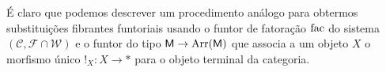 \begin{obs}
  É claro que podemos descrever um procedimento análogo para obtermos substituições fibrantes funtoriais usando o funtor de fatoração $\mathrm{fac}$ do sistema $(\mathcal{C},\mathcal{F} \cap \mathcal{W})$ e o funtor do tipo $\mathsf{M} \to \mathrm{Arr}(\mathsf{M})$ que associa a um objeto $X$ o morfismo único $!_{X}: X \to *$ para o objeto terminal da categoria.  
\end{obs}

